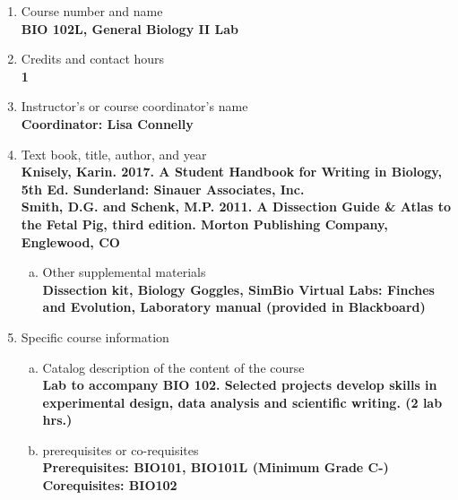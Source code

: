 \label{BIO102L}  %
\begin{enumerate}[1.]
\item Course number and name\\
  {\bfseries
    BIO 102L, General Biology II Lab
  }

\item Credits and contact hours\\
  {\bfseries
    1
  }

\item Instructor's or course coordinator's name\\
  {\bfseries
    Coordinator: Lisa Connelly
  }

\item Text book, title, author, and year\\
  {\bfseries
    Knisely, Karin. 2017. A Student Handbook for Writing in Biology, 5th Ed. Sunderland: Sinauer Associates,
Inc.\\
    Smith, D.G. and Schenk, M.P. 2011. A Dissection Guide \& Atlas to the Fetal Pig, third edition. Morton
Publishing Company, Englewood, CO
  }
\begin{enumerate}[a.]
\item Other supplemental materials\\
  {\bfseries
    Dissection kit, Biology Goggles, SimBio Virtual Labs: Finches and Evolution, Laboratory manual (provided in Blackboard)
  }
\end{enumerate}

\item Specific course information
\begin{enumerate}[a.]
\item Catalog description of the content of the course\\
  {\bfseries
Lab to accompany BIO 102. Selected projects develop skills in experimental design, data analysis and scientific writing. (2 lab hrs.)
  }

\item prerequisites or co-requisites\\
  {\bfseries
    Prerequisites: BIO101, BIO101L (Minimum Grade C-)\\
    Corequisites: BIO102
  }


\end{enumerate}
\end{enumerate}
